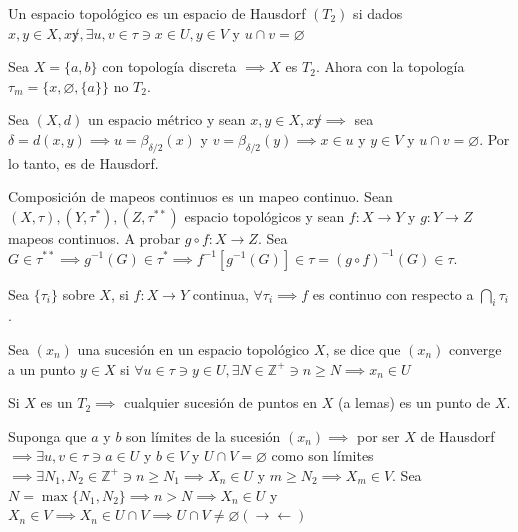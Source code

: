 \begin{definicion}
    Un espacio topológico es un espacio de Hausdorf $(T_2)$ si dados $x,y\in X,x\not y ,\exists u,v\in \tau \ni x\in U,y\in V$ y $u\cap v =\varnothing$
\end{definicion}

\begin{ejemplo}
    Sea $X=\{a,b\}$ con topología discreta $\implies X$ es $T_2$. Ahora con la topología $\tau_m =\{x,\varnothing, \{a\}\}$ no $T_2$.
\end{ejemplo}

\begin{teorema}
    Sea $(X,d)$ un espacio métrico y sean $x,y\in X, x\not y \implies$ sea $\delta=d(x,y)\implies u=\beta_{\delta/2}(x)$ y $v=\beta_{\delta/2}(y)\implies x\in u$ y $y\in V$ y $u\cap v=\varnothing$. Por lo tanto, es de Hausdorf.
\end{teorema}


\begin{teorema}
    Composición de mapeos continuos es un mapeo continuo. Sean $(X,\tau),(Y,\tau^*),(Z,\tau^{**})$ espacio topológicos y sean $f:X\to Y$ y $g:Y\to Z$ mapeos continuos. A probar $g\circ f: X\to Z$. Sea $G\in \tau^{**}\implies g^{-1}(G)\in \tau^*\implies f^{-1}[g^{-1}(G)]\in \tau =(g\circ f)^{-1}(G)\in \tau$.
\end{teorema}

\begin{teorema}
    Sea $\{\tau_i\}$ sobre $X$, si $f:X\to Y$ continua, $\forall \tau_i\implies f$ es continuo con respecto a $\bigcap_i\tau_i$.
\end{teorema}

\begin{definicion}
    Sea $(x_n)$ una sucesión en un espacio topológico $X$, se dice que $(x_n)$ converge a un punto $y\in X$ si $\forall u\in \tau \ni y\in U, \exists N \in \mathbb{Z}^+\ni n\geq N\implies x_n\in U$
\end{definicion}

\begin{teorema}
    Si $X$ es un $T_2\implies $ cualquier sucesión de puntos en $X$ (a lemas) es un punto de $X$.
    \begin{dem}
        Suponga que $a$ y $b$ son límites de la sucesión $(x_n)\implies $ por ser $X$ de Hausdorf $\implies \exists u,v\in \tau \ni a\in U$ y $b\in V$ y $U\cap V=\varnothing$ como son límites $\implies \exists N_1,N_2\in \mathbb{Z}^+\ni n\geq N_1\implies X_n \in U$ y $m\geq N_2\implies X_m\in V$. Sea $N=\max\{N_1,N_2\}\implies n>N\implies X_n\in U $ y $X_n\in V\implies X_n\in U\cap V\implies U\cap V\neq \varnothing(\to\gets)$
    \end{dem}
\end{teorema}

